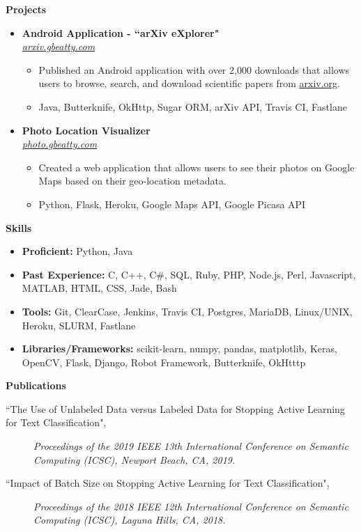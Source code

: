 \documentclass[letterpaper,10pt]{article}
\newcommand{\resitem}[1]{\item #1 \vspace{-2pt}}
\newcommand{\resheading}[1]{{\large \colorbox{mygrey}{\begin{minipage}{\textwidth}{\textbf{#1 \vphantom{p\^{E}}}}\end{minipage}}}}
\newcommand{\ressubheading}[4]{%
  \item\textbf{#1} \hfill #2\null\\
  \textit{#3} \hfill \textit{#4}%
  \vspace{-5pt}
}%
\begin{document}
\resheading{Projects}
\begin{itemize}

\ressubheading{Android Application - ``arXiv eXplorer"}{}{\href{http://arxiv.gbeatty.com}{arxiv.gbeatty.com}}{}
	\begin{itemize}
		\resitem{Published an Android application with over 2,000 downloads that allows users to browse, search, and download scientific papers from \href{http://arxiv.org}{arxiv.org}.}
		\resitem{Java, Butterknife, OkHttp, Sugar ORM, arXiv API, Travis CI, Fastlane}
	\end{itemize}
	

\ressubheading{Photo Location Visualizer}{}{\href{http://photo.gbeatty.com}{photo.gbeatty.com}}{}
	\begin{itemize}
		\resitem{Created a web application that allows users to see their photos on Google Maps based on their geo-location metadata.}
		\resitem{Python, Flask, Heroku, Google Maps API, Google Picasa API}
	\end{itemize}



\end{itemize}

\resheading{Skills}
	\begin{itemize}
	\resitem{\textbf{Proficient:} Python, Java}
	\resitem{\textbf{Past Experience:} C, C++, C\#, SQL, Ruby, PHP, Node.js, Perl, Javascript, MATLAB, HTML, CSS, Jade, Bash}
	\resitem{\textbf{Tools:} Git, ClearCase, Jenkins, Travis CI, Postgres, MariaDB, Linux/UNIX, Heroku, SLURM, Fastlane}
	\resitem{\textbf{Libraries/Frameworks:} scikit-learn, numpy, pandas, matplotlib, Keras, OpenCV, Flask, Django, Robot Framework, Butterknife, OkHtttp}
	\end{itemize}

\resheading{Publications}
\begin{description}
\item[``The Use of Unlabeled Data versus Labeled Data for Stopping Active Learning for Text Classification",]
\emph{Proceedings of the 2019 IEEE 13th International Conference on Semantic Computing (ICSC), Newport Beach, CA, 2019.}
\item[``Impact of Batch Size on Stopping Active Learning for Text Classification",]
\emph{Proceedings of the 2018 IEEE 12th International Conference on Semantic Computing (ICSC), Laguna Hills, CA, 2018.}
\end{description}
\end{document}
